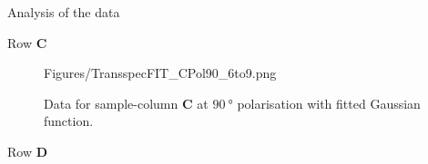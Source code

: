 \documentclass[pdftex, a4paper,11pt, twoside, UKenglish]{report}
\begin{document}
\begin{chapter}{Analysis of the data}
\begin{section}{Row \textbf{C}}
\begin{figure}[ht!]
\begin{minipage}{.95\textwidth}
              {Figures/TransspecFIT_CPol90_6to9.png}
          \caption{Data for sample-column \textbf{C} at $\SI{90}{\degree}$
              polarisation with fitted Gaussian function.}
          \label{fig:TransspecFIT_CPol90_6to9}
        \end{minipage}
      \end{figure}
      
    \end{section}
    
    
    
    \newpage
    \begin{section}{Row \textbf{D}}
      \label{chp::DataD}
      
      

\end{section}
\end{chapter}
\end{document}

